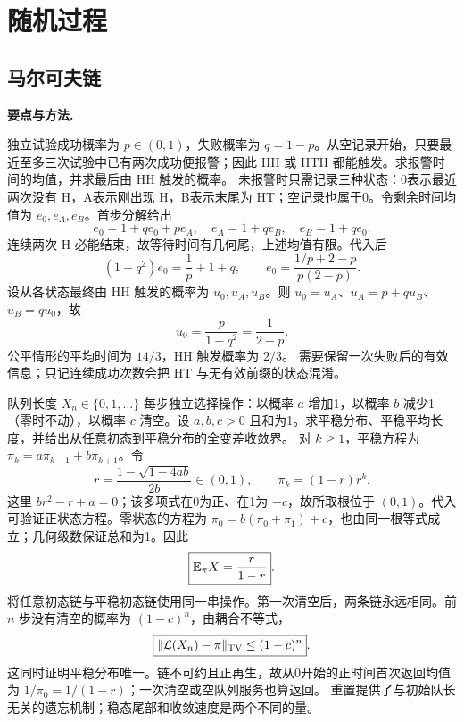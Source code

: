 \chapter{随机过程}
\section{马尔可夫链}
\noindent\textbf{要点与方法.}\enspace



独立试验成功概率为 $p\in(0,1)$，失败概率为 $q=1-p$。从空记录开始，只要最近至多三次试验中已有两次成功便报警；因此 HH 或 HTH 都能触发。求报警时间的均值，并求最后由 HH 触发的概率。
\solution 未报警时只需记录三种状态：0表示最近两次没有 H，A表示刚出现 H，B表示末尾为 HT；空记录也属于0。令剩余时间均值为 $e_0,e_A,e_B$。首步分解给出
\[
 e_0=1+qe_0+pe_A,\quad e_A=1+qe_B,\quad e_B=1+qe_0.
\]
连续两次 H 必能结束，故等待时间有几何尾，上述均值有限。代入后
\[
 (1-q^2)e_0=\frac1p+1+q,\qquad
 \boxed{e_0=\frac{1/p+2-p}{p(2-p)}}.
\]
设从各状态最终由 HH 触发的概率为 $u_0,u_A,u_B$。则 $u_0=u_A$、$u_A=p+qu_B$、$u_B=qu_0$，故
\[
 \boxed{u_0=\frac{p}{1-q^2}=\frac1{2-p}}.
\]
公平情形的平均时间为 $14/3$，HH 触发概率为 $2/3$。
\insight 需要保留一次失败后的有效信息；只记连续成功次数会把 HT 与无有效前缀的状态混淆。



队列长度 $X_n\in\{0,1,\ldots\}$ 每步独立选择操作：以概率 $a$ 增加1，以概率 $b$ 减少1（零时不动），以概率 $c$ 清空。设 $a,b,c>0$ 且和为1。求平稳分布、平稳平均长度，并给出从任意初态到平稳分布的全变差收敛界。
\solution 对 $k\ge1$，平稳方程为 $\pi_k=a\pi_{k-1}+b\pi_{k+1}$。令
\[
 r=\frac{1-\sqrt{1-4ab}}{2b}\in(0,1),
 \qquad \boxed{\pi_k=(1-r)r^k}.
\]
这里 $br^2-r+a=0$；该多项式在0为正、在1为 $-c$，故所取根位于 $(0,1)$。代入可验证正状态方程。零状态的方程为 $\pi_0=b(\pi_0+\pi_1)+c$，也由同一根等式成立；几何级数保证总和为1。因此
\[
 \boxed{\mathbb{E}_\pi X=\frac r{1-r}}.
\]
将任意初态链与平稳初态链使用同一串操作。第一次清空后，两条链永远相同。前 $n$ 步没有清空的概率为 $(1-c)^n$，由耦合不等式，
\[
 \boxed{\|\mathcal L(X_n)-\pi\|_{\rm TV}\le(1-c)^n}.
\]
这同时证明平稳分布唯一。链不可约且正再生，故从0开始的正时间首次返回均值为 $1/\pi_0=1/(1-r)$；一次清空或空队列服务也算返回。
\insight 重置提供了与初始队长无关的遗忘机制；稳态尾部和收敛速度是两个不同的量。


